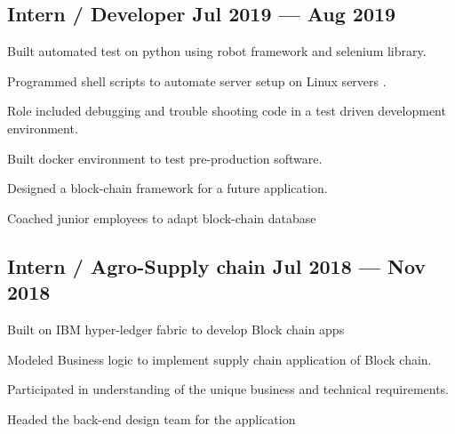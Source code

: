 \documentclass[letter,10pt]{article}
\begin{document}

\subsection{{Intern / Developer \hfill Jul 2019 --- Aug 2019}}
\begin{zitemize}
\item Built automated test on python using robot framework and selenium library.
\item Programmed shell scripts to automate server setup on Linux servers .
\item Role included debugging and trouble shooting code in a test driven development environment.
\item Built docker environment to test pre-production software.
\item Designed a block-chain framework for a future application.
\item Coached junior employees to adapt block-chain database
\end{zitemize}

\subsection{{Intern / Agro-Supply chain \hfill Jul 2018 --- Nov 2018}}
\begin{zitemize}
\item Built on IBM hyper-ledger fabric to develop Block chain apps
\item Modeled Business logic to implement supply chain application of Block chain.
\item Participated in understanding of the unique business and technical requirements.
\item Headed the back-end design team for the application
\end{zitemize}

\end{document}
